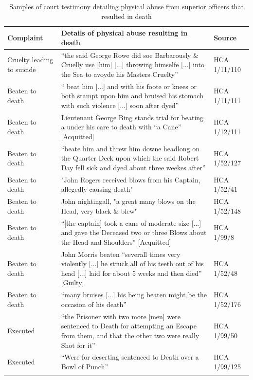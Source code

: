 \begin{table}
\caption{\label{tab:key:4.2} Samples of court testimony detailing physical abuse from superior officers that resulted in death}
\small
\begin{tabularx}{\textwidth}{p{3cm}Ql}
\lsptoprule
\textbf{Complaint} & \textbf{Details} \textbf{of} \textbf{physical} \textbf{abuse} \textbf{resulting} \textbf{in} \textbf{death} & \textbf{Source}\\
\midrule
Cruelty leading to suicide & “the said George Rowe did soe Barbarously \& Cruelly use [him] [...] throwing himselfe [...] into the Sea to avoyde his Masters Cruelty” & HCA 1/11/110\\
Beaten to death & “ beat him [...] and with his foote or knees or both stampt upon him and bruised his stomach with such violence [...] soon after dyed” & HCA 1/11/111\\
Beaten to death & Lieutenant George Bing stands trial for beating a  under his care to death with “a Cane” [Acquitted] & HCA 1/12/111\\
Beaten to death & “beate him and threw him downe headlong on the Quarter Deck upon which the said Robert Day fell sick and dyed about three weekes after” & HCA 1/52/127\\
Beaten to death & "John Rogers received blows from his Captain, allegedly causing death" & HCA 1/52/41\\
Beaten to death & John nightingall, "a great many blows on the Head, very black \& blew" & HCA 1/52/148\\
Beaten to death & “[the captain] took a cane of  moderate size [...] and gave the Deceased two or three Blows about the Head and Shoulders” [Acquitted] & HCA 1/99/8\\
Beaten to death & John Morris beaten “severall times very violently [...] he struck all of his teeth out of his head [...] laid for about 5 weeks and then died” [Guilty] & HCA 1/52/48\\
Beaten to death & “many bruises [...] his being beaten might be the occasion of his death” & HCA 1/52/176\\
Executed & “the Prisoner with two more [men] were sentenced to Death for attempting an Escape from them, and that the other two were really Shot for it” & HCA 1/99/50\\
Executed & “Were for deserting sentenced to Death over a Bowl of Punch” & HCA 1/99/125\\
\lspbottomrule
\end{tabularx}
\end{table}

